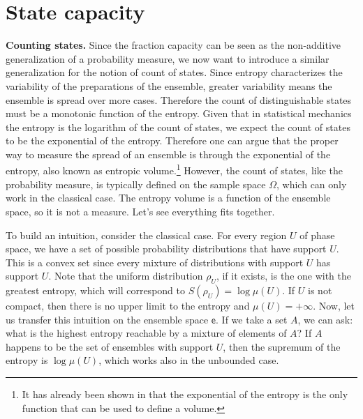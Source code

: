 \documentclass[10pt,twocolumn, nofootinbib]{revtex4-2}
\newcommand{\ens}[1][e] {\mathsf{#1}} %
\begin{document}
\section{State capacity}

\textbf{Counting states.} Since the fraction capacity can be seen as the non-additive generalization of a probability measure, we now want to introduce a similar generalization for the notion of count of states. Since entropy characterizes the variability of the preparations of the ensemble, greater variability means the ensemble is spread over more cases. Therefore the count of distinguishable states must be a monotonic function of the entropy. Given that in statistical mechanics the entropy is the logarithm of the count of states, we expect the count of states to be the exponential of the entropy. Therefore one can argue that the proper way to measure the spread of an ensemble is through the exponential of the entropy, also known as entropic volume.\footnote{It has already been shown in \cite{hall1999} that the exponential of the entropy is the only function that can be used to define a volume.} However, the count of states, like the probability measure, is typically defined on the sample space $\Omega$, which can only work in the classical case. The entropy volume is a function of the ensemble space, so it is not a measure. Let's see everything fits together.

To build an intuition, consider the classical case. For every region $U$ of phase space, we have a set of possible probability distributions that have support $U$. This is a convex set since every mixture of distributions with support $U$ has support $U$. Note that the uniform distribution $\rho_U$, if it exists, is the one with the greatest entropy, which will correspond to $S(\rho_U) = \log \mu(U)$. If $U$ is not compact, then there is no upper limit to the entropy and $\mu(U) = +\infty$. Now, let us transfer this intuition on the ensemble space $\ens$. If we take a set $A$, we can ask: what is the highest entropy reachable by a mixture of elements of $A$? If $A$ happens to be the set of ensembles with support $U$, then the supremum of the entropy is $\log \mu(U)$, which works also in the unbounded case.
\end{document}
